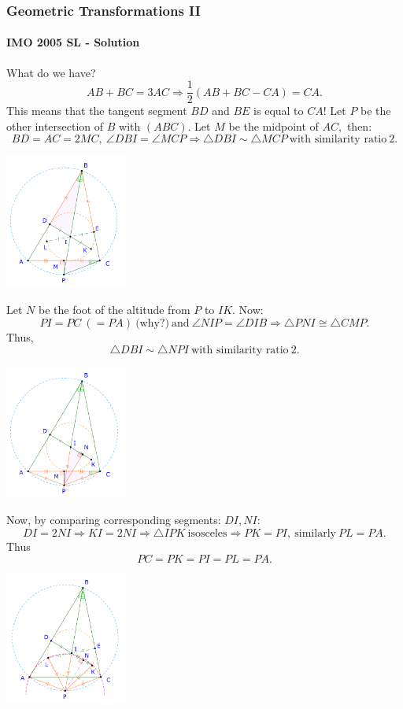 \documentclass[8pt,xcolor=table,dvipsnames]{beamer}
\providecommand{\half}{\frac{1}{2}}
\begin{document}
\begin{frame}[t]
    \frametitle{Geometric Transformations II}
    \framesubtitle{IMO 2005 SL - Solution}
    \begin{overprint}
        What do we have?
        \[ 
            AB+BC=3AC \Rightarrow \half(AB+BC-CA) = CA.
        \]
        This means that the tangent segment $BD$ and $BE$ is equal to $CA$!
        \bigbreak
        Let $P$ be the other intersection of $B$ with $(ABC).$ Let $M$ be the midpoint of $AC,$ then:
        \[
            BD = AC = 2MC,\ \angle DBI = \angle MCP \Rightarrow \triangle DBI \sim \triangle MCP\ \text{with similarity ratio}\ 2.
        \]
        \begin{center}
            \includegraphics[width=4cm]{./svg/pdf/imo-sl-2005-g1-2.pdf}
        \end{center}
        Let $N$ be the foot of the altitude from $P$ to $IK$. Now:
        \[
            PI = PC\ (= PA)\ \text{(why?)}\ \text{and}\ \angle NIP = \angle DIB \Rightarrow \triangle PNI \cong \triangle CMP.
        \]
        Thus,
        \[
            \triangle DBI \sim \triangle NPI\ \text{with similarity ratio}\ 2.
        \]
        \begin{center}
            \includegraphics[width=4cm]{./svg/pdf/imo-sl-2005-g1-3.pdf}
        \end{center}
        Now, by comparing corresponding segments: $DI, NI$:
        \[
            DI = 2 NI \Rightarrow KI = 2 NI \Rightarrow \triangle IPK\ \text{isosceles} \Rightarrow PK = PI,\ \text{similarly}\ PL = PA.
        \]
        Thus \[ PC = PK = PI = PL = PA. \]
        \begin{center}
            \includegraphics[width=4cm]{./svg/pdf/imo-sl-2005-g1-4.pdf}
        \end{center}
    \end{overprint}
\end{frame}
\end{document}
